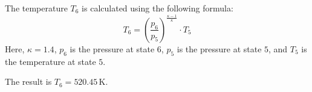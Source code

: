 The temperature \( T_6 \) is calculated using the following formula:  
\[
T_6 = \left( \frac{p_6}{p_5} \right)^{\frac{\kappa - 1}{\kappa}} \cdot T_5
\]  
Here, \( \kappa = 1.4 \), \( p_6 \) is the pressure at state \( 6 \), \( p_5 \) is the pressure at state \( 5 \), and \( T_5 \) is the temperature at state \( 5 \).  

The result is \( T_6 = 520.45 \, \text{K} \).